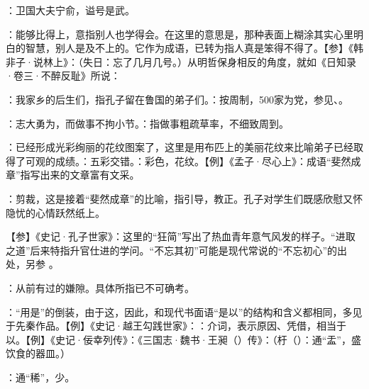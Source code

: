 {
\item {}：卫国大夫宁俞，谥号是武。
\item {}：能够比得上，意指别人也学得会。在这里的意思是，那种表面上糊涂其实心里明白的智慧，别人是及不上的。它作为成语，已转为指人真是笨得不得了。【参】《韩非子·说林上》：（失日：忘了几月几号。）从明哲保身相反的角度，就如《日知录·卷三·不醉反耻》所说：
}
{}


{
\begin{lyitemize}
\item {}：我家乡的后生们，指孔子留在鲁国的弟子们。：按周制，500家为党，参见、。%
\item {}：志大勇为，而做事不拘小节。：指做事粗疏草率，不细致周到。
\item {}：已经形成光彩绚丽的花纹图案了，这里是用布匹上的美丽花纹来比喻弟子已经取得了可观的成绩。：五彩交错。：彩色，花纹。【例】《孟子·尽心上》：成语“斐然成章”指写出来的文章富有文采。
\item {}：剪裁，这是接着“斐然成章”的比喻，指引导，教正。孔子对学生们既感欣慰又怀隐忧的心情跃然纸上。
\end{lyitemize}
【参】《史记·孔子世家》：这里的“狂简”写出了热血青年意气风发的样子。“进取之道”后来特指升官仕进的学问。“不忘其初”可能是现代常说的“不忘初心”的出处，另参  。 %
}
{}


{
\item {}：从前有过的嫌隙。具体所指已不可确考。
\item {}：“用是”的倒装，由于这，因此，和现代书面语“是以”的结构和含义都相同，多见于先秦作品。【例】《史记·越王勾践世家》：：介词，表示原因、凭借，相当于以。【例】《史记·佞幸列传》：《三国志·魏书·王昶（）传》：（杅（）：通“盂”，盛饮食的器皿。）
\item {}：通“稀”，少。
}
{}


